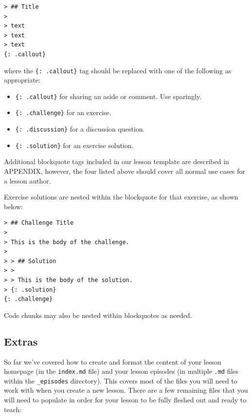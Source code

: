 \documentclass[]{book}
\providecommand{\tightlist}{%
  \setlength{\itemsep}{0pt}\setlength{\parskip}{0pt}}
\begin{document}
\begin{verbatim}
> ## Title
>
> text
> text
> text
{: .callout}
\end{verbatim}

where the \texttt{\{:\ .callout\}} tag should be replaced with one of the following as appropriate:

\begin{itemize}
\tightlist
\item
  \texttt{\{:\ .callout\}} for sharing an aside or comment. Use sparingly.
\item
  \texttt{\{:\ .challenge\}} for an exercise.
\item
  \texttt{\{:\ .discussion\}} for a discussion question.
\item
  \texttt{\{:\ .solution\}} for an exercise solution.
\end{itemize}

Additional blockquote tags included in our lesson template are described in APPENDIX, however, the four listed
above should cover all normal use cases for a lesson author.

Exercise solutions are nested within the blockquote for that exercise, as shown below:

\begin{verbatim}
> ## Challenge Title
>
> This is the body of the challenge.
>
> > ## Solution
> >
> > This is the body of the solution.
> {: .solution}
{: .challenge}
\end{verbatim}

Code chunks may also be nested within blockquotes as needed.

\hypertarget{extras}{%
\subsection{Extras}\label{extras}}

So far we've covered how to create and format the content of your lesson homepage (in the \texttt{index.md} file)
and your lesson episodes (in multiple \texttt{.md} files within the \texttt{\_episodes} directory). This covers most of the
files you will need to work with when you create a new lesson. There are a few remaining files that you will
need to populate in order for your lesson to be fully fleshed out and ready to teach:
\end{document}
